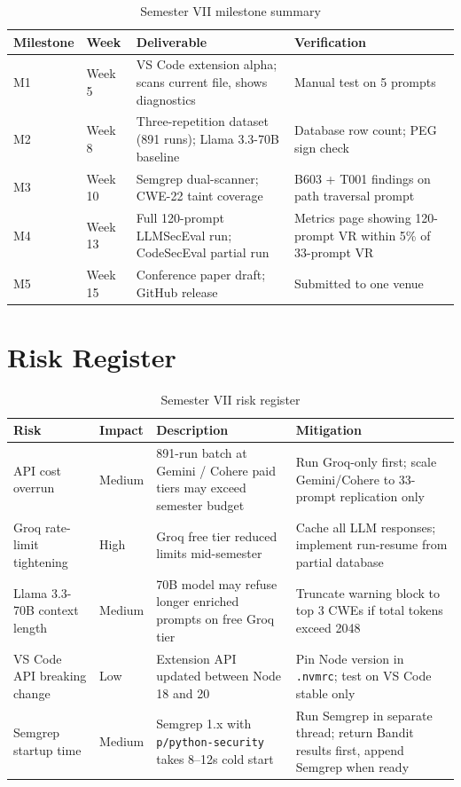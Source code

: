 \documentclass[12pt,a4paper]{report}
\begin{document}
\begin{table}[H]
\centering
\caption{Semester VII milestone summary}
\label{tab:milestones}
\renewcommand{\arraystretch}{1.3}
\begin{tabularx}{\textwidth}{@{}llXl@{}}
\toprule
\textbf{Milestone} & \textbf{Week} & \textbf{Deliverable} & \textbf{Verification} \\
\midrule
M1 & Week 5  & VS Code extension alpha; scans current file, shows diagnostics
             & Manual test on 5 prompts \\
M2 & Week 8  & Three-repetition dataset (891 runs); Llama 3.3-70B baseline
             & Database row count; PEG sign check \\
M3 & Week 10 & Semgrep dual-scanner; CWE-22 taint coverage
             & B603 + T001 findings on path traversal prompt \\
M4 & Week 13 & Full 120-prompt LLMSecEval run; CodeSecEval partial run
             & Metrics page showing 120-prompt VR within 5\% of 33-prompt VR \\
M5 & Week 15 & Conference paper draft; GitHub release
             & Submitted to one venue \\
\bottomrule
\end{tabularx}
\end{table}

\section{Risk Register}

\begin{table}[H]
\centering
\caption{Semester VII risk register}
\label{tab:risks}
\renewcommand{\arraystretch}{1.3}
\begin{tabularx}{\textwidth}{@{}p{1.4in}p{0.55in}Xp{1.3in}@{}}
\toprule
\textbf{Risk} & \textbf{Impact} & \textbf{Description} & \textbf{Mitigation} \\
\midrule
API cost overrun & Medium &
  891-run batch at Gemini / Cohere paid tiers may exceed semester budget &
  Run Groq-only first; scale Gemini/Cohere to 33-prompt replication only \\
Groq rate-limit tightening & High &
  Groq free tier reduced limits mid-semester &
  Cache all LLM responses; implement run-resume from partial database \\
Llama 3.3-70B context length & Medium &
  70B model may refuse longer enriched prompts on free Groq tier &
  Truncate warning block to top 3 CWEs if total tokens exceed 2048 \\
VS Code API breaking change & Low &
  Extension API updated between Node 18 and 20 &
  Pin Node version in \texttt{.nvmrc}; test on VS Code stable only \\
Semgrep startup time & Medium &
  Semgrep 1.x with \texttt{p/python-security} takes 8--12s cold start &
  Run Semgrep in separate thread; return Bandit results first, append
  Semgrep when ready \\
\bottomrule
\end{tabularx}
\end{table}
\end{document}
